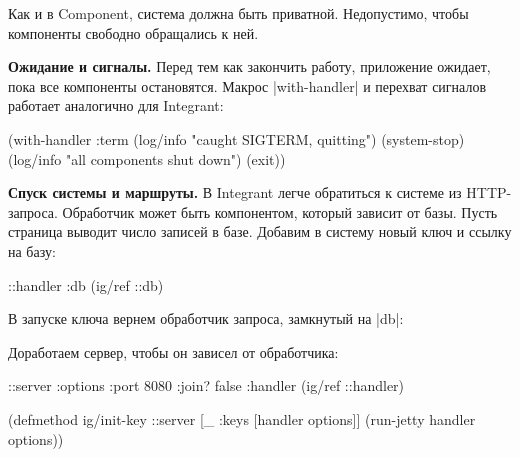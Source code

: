 Как и в Component, система должна быть приватной. Недопустимо, чтобы
компоненты свободно обращались к ней.

\textbf{Ожидание и сигналы.} Перед тем как закончить работу, приложение ожидает,
пока все компоненты остановятся. Макрос \spverb|with-handler| и перехват
сигналов работает аналогично для Integrant:

\begin{english}
  \begin{clojure}
(with-handler :term
  (log/info "caught SIGTERM, quitting")
  (system-stop)
  (log/info "all components shut down")
  (exit))
  \end{clojure}
\end{english}

\textbf{Спуск системы и маршруты.} В Integrant легче обратиться к системе из
HTTP-запроса. Обработчик может быть компонентом, который зависит от базы. Пусть
страница выводит число записей в базе. Добавим в систему новый ключ и ссылку на
базу:

\begin{english}
  \begin{clojure}
{::handler {:db (ig/ref ::db)}}
  \end{clojure}
\end{english}

\noindent
В запуске ключа вернем обработчик запроса, замкнутый на \spverb|db|:

\begin{english}
\end{english}

\noindent
Доработаем сервер, чтобы он зависел от обработчика:

\begin{english}
  \begin{clojure}
{::server {:options {:port 8080 :join? false}
           :handler (ig/ref ::handler)}}

(defmethod ig/init-key ::server
  [_ {:keys [handler options]}]
  (run-jetty handler options))
  \end{clojure}
\end{english}

